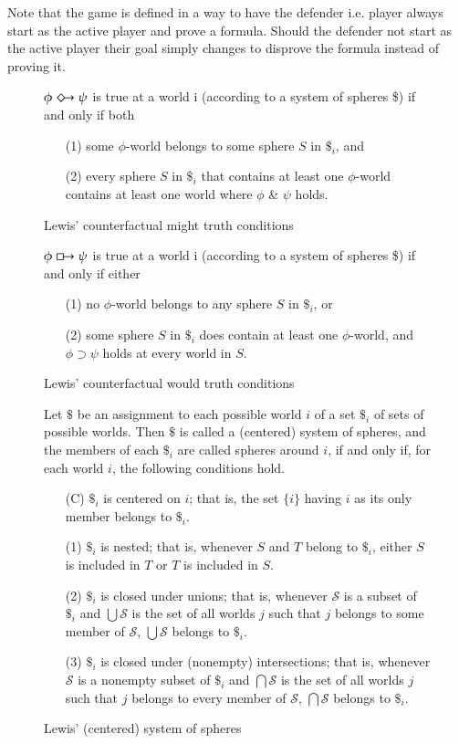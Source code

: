 \documentclass[a4paper,american]{paper}
\begin{document}
	Note that the game is defined in a way to have the defender i.e. player always start as the active player and prove a formula. Should the defender not start as the active player their goal simply changes to disprove the formula instead of proving it.
	\newpage
\begin{figure}[H]
	\centering
	$\phi\Diamondright\psi$ is true at a world i (according to a system of spheres \$) if and only if both
	\begin{itemize}
	\item[(1)] some $\phi$-world belongs to some sphere $S$ in $\$_i$, and
	\item[(2)] every sphere $S$ in $\$_i$ that contains at least one $\phi$-world contains at least one world where $\phi$ \& $\psi$ holds.
	\end{itemize}
	\caption{Lewis' counterfactual might truth conditions}
	\label{fig:counterfactual_might}
\end{figure}
\begin{figure}[H]
	\centering
	$\phi\boxright\psi$ is true at a world i (according to a system of spheres \$) if and only if either
	\begin{itemize}
	\item[(1)] no $\phi$-world belongs to any sphere $S$ in $\$_i$, or
	\item[(2)] some sphere $S$ in $\$_i$ does contain at least one $\phi$-world, and $\phi\supset\psi$ holds at every world in $S$.
	\end{itemize}
	\caption{Lewis' counterfactual would truth conditions}
	\label{fig:counterfactual_would}
\end{figure}
\begin{figure}[H]
	\centering
	Let $\$$ be an assignment to each possible world $i$ of a set $\$_i$ of sets of possible worlds. Then $\$$ is called a (centered) system of spheres, and the members of each $\$_i$ are called spheres around $i$, if and only if, for each world $i$, the following conditions hold.
	\begin{itemize}
	\item[(C)] $\$_i$ is centered on $i$; that is, the set $\{i\}$ having $i$ as its only member belongs to $\$_i$.
	\item[(1)] $\$_i$ is nested; that is, whenever $S$ and $T$ belong to $\$_i$, either $S$ is included in $T$ or $T$ is included in $S$.
	\item[(2)] $\$_i$ is closed under unions; that is, whenever $\mathscr{S}$ is a subset of $\$_i$ and $\bigcup\mathscr{S}$ is the set of all worlds $j$ such that $j$ belongs to some member of $\mathscr{S}$, $\bigcup\mathscr{S}$ belongs to $\$_i$.
	\item[(3)] $\$_i$ is closed under (nonempty) intersections; that is, whenever $\mathscr{S}$ is a nonempty subset of $\$_i$ and $\bigcap\mathscr{S}$ is the set of all worlds $j$ such that $j$ belongs to every member of $\mathscr{S}$, $\bigcap\mathscr{S}$ belongs to $\$_i$.
	\end{itemize}
	\caption{Lewis' (centered) system of spheres}
	\label{fig:system_of_spheres}
\end{figure}
\end{document}

